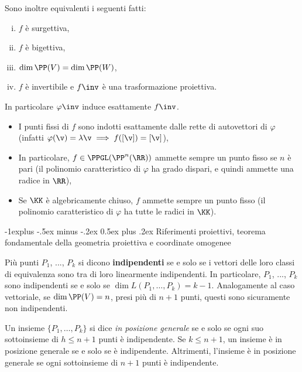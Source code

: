 \documentclass[10pt,landscape]{article}
\makeatletter
\renewcommand{\subsection}{\@startsection{subsection}{2}{0mm}%
	{-1explus -.5ex minus -.2ex}%
	{0.5ex plus .2ex}%
	{\normalfont\normalsize\bfseries}}
\makeatother
\begin{document}
\begin{multicols}{3}
		Sono inoltre equivalenti i seguenti fatti:
		
		\begin{enumerate}[(i)]
			\item $f$ è surgettiva,
			\item $f$ è bigettiva,
			\item $\dim \PP(V) = \dim \PP(W)$,
			\item $f$ è invertibile e $f\inv$ è una trasformazione proiettiva.
		\end{enumerate}
		
		In particolare $\varphi\inv$ induce esattamente $f\inv$.
		
		\begin{itemize}
			\item I punti fissi di $f$ sono indotti esattamente dalle rette di autovettori
				di $\varphi$ (infatti $\varphi(\v) = \lambda \v \implies f([\v]) = [\v]$),
			\item In particolare, $f \in \PPGL(\PP^n(\RR))$ ammette sempre un punto
				fisso se $n$ è pari (il polinomio caratteristico di $\varphi$ ha grado
				dispari, e quindi ammette una radice in $\RR$),
			\item Se $\KK$ è algebricamente chiuso, $f$ ammette sempre un punto fisso
				(il polinomio caratteristico di $\varphi$ ha tutte le radici in $\KK$).
		\end{itemize}
		
		\subsection{Riferimenti proiettivi, teorema fondamentale della geometria proiettiva
			e coordinate omogenee}
		
		Più punti $P_1$, ..., $P_k$ si dicono \textbf{indipendenti} se e solo se
		i vettori delle loro classi di equivalenza sono tra di loro linearmente indipendenti.
		In particolare, $P_1$, ..., $P_k$ sono indipendenti se e solo se
		$\dim L(P_1, \ldots, P_k) = k-1$. Analogamente al caso vettoriale, se $\dim \PP(V) = n$,
		presi più di $n+1$ punti, questi sono sicuramente non indipendenti. \medskip
		
		
		
		Un insieme $\{P_1, \ldots, P_k\}$ si dice \textit{in posizione generale} se e solo se
		ogni suo sottoinsieme di $h \leq n+1$ punti è indipendente. Se $k \leq n+1$, un
		insieme è in posizione generale se e solo se è indipendente. Altrimenti, l'insieme
		è in posizione generale se ogni sottoinsieme di $n+1$ punti è indipendente. \medskip
		

\end{multicols}
\end{document}
